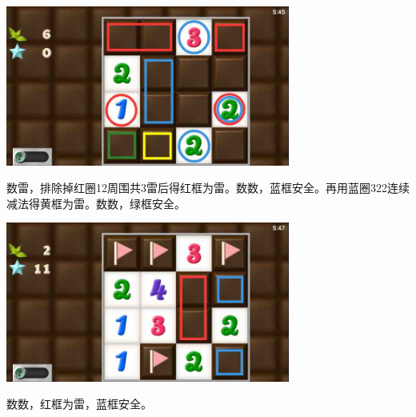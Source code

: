 \subsection{} %
\begin{center}
    \includegraphics[width=0.7\textwidth]{puzzlelow/64-1.jpg}
\end{center}
数雷，排除掉红圈12周围共3雷后得红框为雷。数数，蓝框安全。再用蓝圈322连续减法得黄框为雷。数数，绿框安全。
\begin{center}
    \includegraphics[width=0.7\textwidth]{puzzlelow/64-2.jpg}
\end{center}
数数，红框为雷，蓝框安全。

